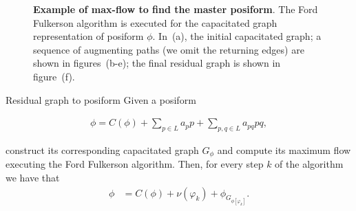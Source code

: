 \begin{figure}
{}%
\caption{\textbf{Example of max-flow to find the master posiform}. The Ford Fulkerson algorithm is executed for the capacitated graph representation of posiform $\phi$. In~(a), the initial capacitated graph; a sequence of augmenting paths (we omit the returning edges) are shown in figures~(b-e); the final residual graph is shown in figure~(f).  }
\label{ch2:fig:posiform-capacitated-graph}
\end{figure}

\begin{proposition}{Residual graph to posiform}
	Given a posiform 
	
	\begin{align*}
		\phi = C(\phi) + \sum_{p \in L}{a_pp} + \sum_{p,q \in L}{a_{pq}pq},
	\end{align*}
	
	construct its corresponding capacitated graph $G_{\phi}$ and compute its maximum flow executing the Ford Fulkerson algorithm. Then, for every step $k$ of the algorithm we have that
	\begin{align*}
		\phi &= C(\phi) + \nu(\varphi_k) + \phi_{ G_{ \phi [\varphi_k]}}.
	\end{align*}
\end{proposition}

